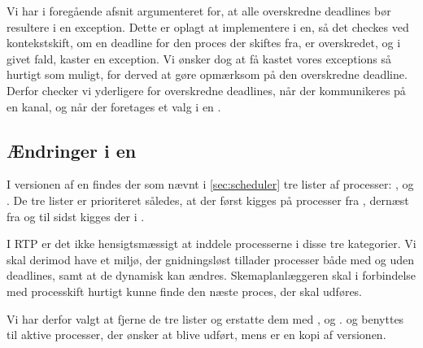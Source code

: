 Vi har i foregående afsnit argumenteret for, at alle overskredne deadlines bør resultere i en exception. Dette er oplagt at implementere i \sched en, så det checkes ved kontekstskift, om en deadline for den proces der skiftes fra, er overskredet, og i givet fald, kaster en exception. Vi ønsker dog at få kastet vores exceptions så hurtigt som muligt, for derved at gøre opmærksom på den overskredne deadline. Derfor checker vi yderligere for overskredne deadlines, når der kommunikeres på en kanal, og når der foretages et valg i en . 

\subsection{Ændringer i \sched en}
\label{sec:sched-changes}
I  versionen af \sched en findes der som nævnt i \cref{sec:scheduler} tre lister af processer: ,  og . De tre lister er prioriteret således, at der først kigges på processer fra , dernæst fra  og til sidst kigges der i .

I RTP er det ikke hensigtsmæssigt at inddele processerne i disse tre  kategorier. Vi skal derimod have et miljø, der gnidningsløst tillader processer både med og uden deadlines, samt at de dynamisk kan ændres. Skemaplanlæggeren skal i forbindelse med processkift hurtigt kunne finde den næste proces, der skal udføres.

Vi har derfor valgt at fjerne  de tre lister og erstatte dem  med ,   og .  og    benyttes til aktive processer, der ønsker at blive udført, mens  er en kopi af \des versionen. 


